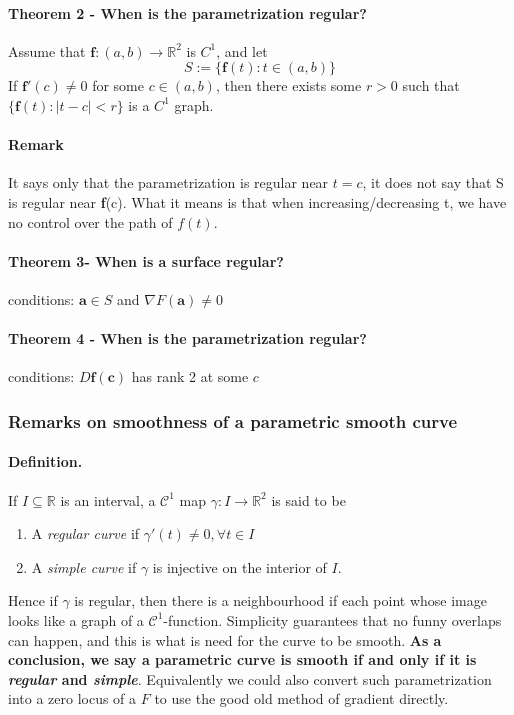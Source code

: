 \documentclass[11pt]{article}
\newcommand{\tb}[1]{\textbf{#1}}
\newcommand{\real}[0]{\mathbb{R}}
\newcommand{\func}[3]{\tb{#1}: {#2} \rightarrow {#3} }
\begin{document}
\paragraph{Theorem 2 - When is the parametrization regular?} 
Assume that $\func{f}{(a, b)}{\real ^2}$ is $C^1$, and let
$$S:=\{ \tb{f}(t): t \in (a, b)\}$$
If $\tb{f}'(c) \neq 0$ for some $c \in (a, b)$, then there exists some $r>0$ such that $\{ \tb{f} (t): |t-c| < r\}$ is a $C^1$ graph. \newline
\paragraph{Remark}
It says only that the parametrization is regular near $t = c$, it does not say that S is regular near \tb{f}(c). What it means is that when increasing/decreasing t, we have no control over the path of $f(t)$.
\paragraph{Theorem 3- When is a surface regular?}
conditions: $\tb{a} \in S$ and $\nabla F(\tb{a}) \neq 0$
\paragraph{Theorem 4 - When is the parametrization regular?}
conditions: $D\tb{f}(\tb{c})$ has rank 2 at some $c$

\subsubsection{Remarks on smoothness of a parametric smooth curve} 
\paragraph{Definition.}If $I\subseteq \real$ is an interval, a $\mathcal{C}^1$ map $\gamma: I \rightarrow{} \real^2$ is said to be
\begin{enumerate}
    \item A \textit{regular curve} if $\gamma'(t)\neq 0, \forall t\in I$
    \item A \textit{simple curve} if $\gamma$ is injective on the interior of $I$.
\end{enumerate}
Hence if $\gamma$ is regular, then there is a neighbourhood if each point whose image looks like a graph of a $\mathcal{C}^1$-function. Simplicity guarantees that no funny overlaps can happen, and this is what is need for the curve to be smooth. \textbf{As a conclusion, we say a parametric curve is smooth if and only if it is \textit{regular} and \textit{simple}}. Equivalently we could also convert such parametrization into a zero locus of a $F$ to use the good old method of gradient directly.
\end{document}

